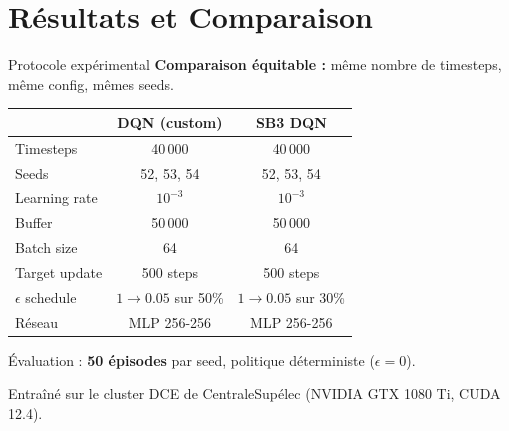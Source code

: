 \documentclass[10pt]{beamer}
\begin{document}
\section{R\'esultats et Comparaison}

\begin{frame}{Protocole exp\'erimental}
    \textbf{Comparaison \'equitable :} m\^eme nombre de timesteps, m\^eme config, m\^emes seeds.

    \vspace{0.3cm}
    \begin{table}
        \centering
        {\small
        \begin{tabular}{lcc}
            \toprule
            & \textbf{DQN (custom)} & \textbf{SB3 DQN} \\
            \midrule
            Timesteps & 40\,000 & 40\,000 \\
            Seeds & 52, 53, 54 & 52, 53, 54 \\
            Learning rate & $10^{-3}$ & $10^{-3}$ \\
            Buffer & 50\,000 & 50\,000 \\
            Batch size & 64 & 64 \\
            Target update & 500 steps & 500 steps \\
            $\epsilon$ schedule & $1 \to 0.05$ sur 50\% & $1 \to 0.05$ sur 30\% \\
            R\'eseau & MLP 256-256 & MLP 256-256 \\
            \bottomrule
        \end{tabular}
        }
    \end{table}

    \vspace{0.2cm}
    \'Evaluation : \textbf{50 \'episodes} par seed, politique d\'eterministe ($\epsilon = 0$).

    \vspace{0.2cm}
    {\small Entra\^in\'e sur le cluster DCE de CentraleSup\'elec (NVIDIA GTX 1080 Ti, CUDA 12.4).}
\end{frame}
\end{document}
